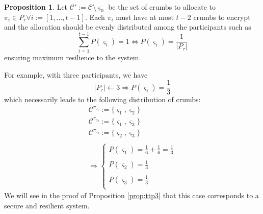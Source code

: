 \documentclass[twoside,twocolumn]{article}
\theoremstyle{definition}
\newtheorem{proposition}{Proposition}
\theoremstyle{remark}
\begin{document}
\begin{proposition}
    \label{prop:allocation}
    Let $\mathcal{C}' := \mathcal{C} \setminus \varsigma_0$ be the set of crumbs to allocate to $\pi_i \in P_\tau \forall i := [1, \dots, t-1]$.
    Each $\pi_i$ must have at most $t-2$ crumbs to encrypt and the allocation should be evenly distributed among the participants such as 
    \begin{equation}
        \label{eq:allocation}
        \sum_{i=1}^{t-1} P(\varsigma_i) = 1 \iff P(\varsigma_i) = \frac{1}{|P_\tau|}
    \end{equation}  
    ensuring maximum resilience to the system.

    For example, with three participants, we have $$
    |P_\tau| \gets 3 \Rightarrow P(\varsigma_i) = \frac{1}{3}
    $$
    which necessarily leads to the following distribution of crumbs:$$
        \begin{array}{l}
            \mathcal{C}^{\pi_{\tau_1}} := \{ \varsigma_1, \varsigma_2 \} \\
            \mathcal{C}^{\pi_{\tau_2}} := \{ \varsigma_1, \varsigma_3 \} \\
            \mathcal{C}^{\pi_{\tau_3}} := \{ \varsigma_2, \varsigma_3 \} \\ \\
            \Rightarrow \left\{
                \begin{array}{l}
                    P(\varsigma_1) = \frac{1}{6} + \frac{1}{6} = \frac{1}{3} \\ \\
                    P(\varsigma_2) = \frac{1}{3} \\ \\
                    P(\varsigma_3) = \frac{1}{3} \\
                \end{array}
            \right.
        \end{array}
    $$
    We will see in the proof of Proposition \ref{prop:ttp3} that this case corresponds to a secure and resilient system.
\end{proposition}


\end{document}
